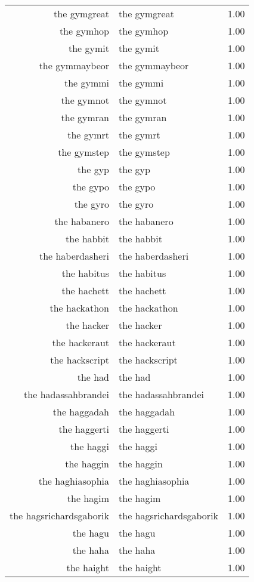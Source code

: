 \begin{table}[ht]
\begin{tabular}{rlr}
  the gymgreat & the gymgreat & 1.00 \\ 
  the gymhop & the gymhop & 1.00 \\ 
  the gymit & the gymit & 1.00 \\ 
  the gymmaybeor & the gymmaybeor & 1.00 \\ 
  the gymmi & the gymmi & 1.00 \\ 
  the gymnot & the gymnot & 1.00 \\ 
  the gymran & the gymran & 1.00 \\ 
  the gymrt & the gymrt & 1.00 \\ 
  the gymstep & the gymstep & 1.00 \\ 
  the gyp & the gyp & 1.00 \\ 
  the gypo & the gypo & 1.00 \\ 
  the gyro & the gyro & 1.00 \\ 
  the habanero & the habanero & 1.00 \\ 
  the habbit & the habbit & 1.00 \\ 
  the haberdasheri & the haberdasheri & 1.00 \\ 
  the habitus & the habitus & 1.00 \\ 
  the hachett & the hachett & 1.00 \\ 
  the hackathon & the hackathon & 1.00 \\ 
  the hacker & the hacker & 1.00 \\ 
  the hackeraut & the hackeraut & 1.00 \\ 
  the hackscript & the hackscript & 1.00 \\ 
  the had & the had & 1.00 \\ 
  the hadassahbrandei & the hadassahbrandei & 1.00 \\ 
  the haggadah & the haggadah & 1.00 \\ 
  the haggerti & the haggerti & 1.00 \\ 
  the haggi & the haggi & 1.00 \\ 
  the haggin & the haggin & 1.00 \\ 
  the haghiasophia & the haghiasophia & 1.00 \\ 
  the hagim & the hagim & 1.00 \\ 
  the hagsrichardsgaborik & the hagsrichardsgaborik & 1.00 \\ 
  the hagu & the hagu & 1.00 \\ 
  the haha & the haha & 1.00 \\ 
  the haight & the haight & 1.00 \\ 

\end{tabular}
\end{table}
